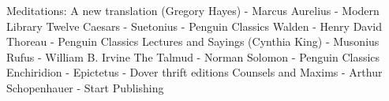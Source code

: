 \begin{thebibliography}{99}

   Meditations: A new translation (Gregory Hayes) - Marcus Aurelius - Modern Library
    Twelve Caesars -  Suetonius - Penguin Classics
     Walden - Henry David Thoreau - Penguin Classics
    Lectures and Sayings (Cynthia King) - Musonius Rufus - William B. Irvine
      The Talmud - Norman Solomon - Penguin Classics
     Enchiridion - Epictetus - Dover thrift editions
    Counsels and Maxims - Arthur Schopenhauer - Start Publishing

\end{thebibliography}
